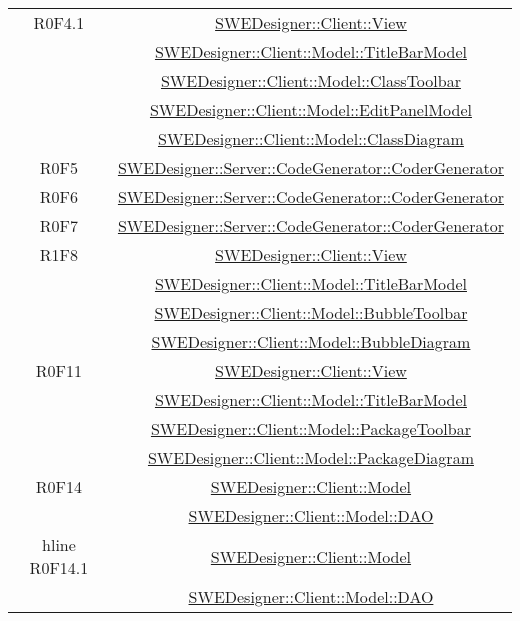 \documentclass[../SpecificaTecnica.tex]{subfiles}
\begin{document}
\begin{longtable}{|c|c|}
		R0F4.1 & \hyperlink{SWEDesigner::Client::View}{SWEDesigner::Client::View} \\& \hyperlink{SWEDesigner::Client::Model::TitleBarModel}{SWEDesigner::Client::Model::TitleBarModel} \\& \hyperlink{SWEDesigner::Client::Model::ClassToolbar}{SWEDesigner::Client::Model::ClassToolbar} \\& \hyperlink{SWEDesigner::Client::Model::EditPanelModel}{SWEDesigner::Client::Model::EditPanelModel} \\& \hyperlink{SWEDesigner::Client::Model::ClassDiagram}{SWEDesigner::Client::Model::ClassDiagram}\\\hline
		R0F5 & \hyperlink{SWEDesigner::Server::CodeGenerator::CoderGenerator}{SWEDesigner::Server::CodeGenerator::CoderGenerator} \\\hline
		R0F6 & \hyperlink{SWEDesigner::Server::CodeGenerator::CoderGenerator}{SWEDesigner::Server::CodeGenerator::CoderGenerator}\\\hline
		R0F7 & \hyperlink{SWEDesigner::Server::CodeGenerator::CoderGenerator}{SWEDesigner::Server::CodeGenerator::CoderGenerator}\\\hline
		R1F8 & \hyperlink{SWEDesigner::Client::View}{SWEDesigner::Client::View} \\& \hyperlink{SWEDesigner::Client::Model::TitleBarModel}{SWEDesigner::Client::Model::TitleBarModel} \\& \hyperlink{SWEDesigner::Client::Model::BubbleToolbar}{SWEDesigner::Client::Model::BubbleToolbar} \\& \hyperlink{SWEDesigner::Client::Model::BubbleDiagram}{SWEDesigner::Client::Model::BubbleDiagram} \\\hline
		R0F11 & \hyperlink{SWEDesigner::Client::View}{SWEDesigner::Client::View} \\& \hyperlink{SWEDesigner::Client::Model::TitleBarModel}{SWEDesigner::Client::Model::TitleBarModel} \\& \hyperlink{SWEDesigner::Client::Model::PackageToolbar}{SWEDesigner::Client::Model::PackageToolbar} \\& \hyperlink{SWEDesigner::Client::Model::PackageDiagram}{SWEDesigner::Client::Model::PackageDiagram} \\\hline
		R0F14 & \hyperlink{SWEDesigner::Client::Model}{SWEDesigner::Client::Model} \\& \hyperlink{SWEDesigner::Client::Model::DAO}{SWEDesigner::Client::Model::DAO}\\hline
		R0F14.1 & \hyperlink{SWEDesigner::Client::Model}{SWEDesigner::Client::Model} \\& \hyperlink{SWEDesigner::Client::Model::DAO}{SWEDesigner::Client::Model::DAO}\\\hline

\end{longtable}
\end{document}
